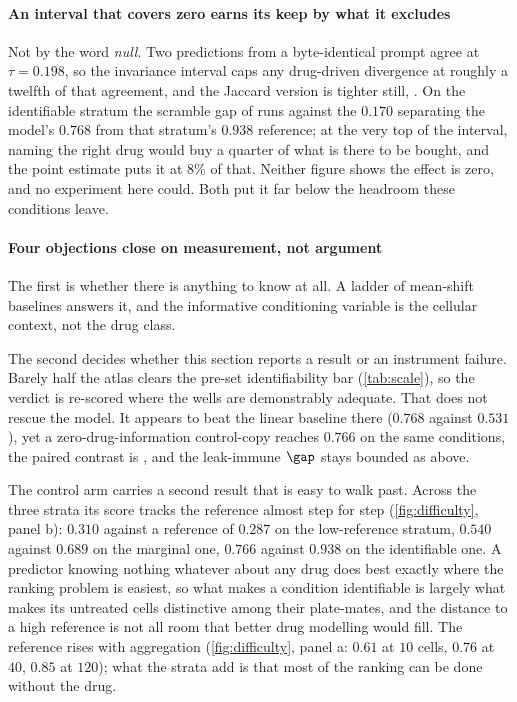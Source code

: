 \paragraph{An interval that covers zero earns its keep by what it excludes} Not
by the word \emph{null}. Two predictions from a byte-identical prompt agree at
$\tau = 0.198$, so the invariance interval caps any drug-driven divergence at
roughly a twelfth of that agreement, and the Jaccard version is tighter still,
. On the identifiable stratum the scramble gap of
 runs against the $0.170$ separating the model's
$0.768$ from that stratum's $0.938$ reference; at the very top of the interval,
naming the right drug would buy a quarter of what is there to be bought, and the
point estimate puts it at $8\%$ of that. Neither figure shows the effect is
zero, and no experiment here could. Both put it far below the headroom these
conditions leave.

\paragraph{Four objections close on measurement, not argument} The first is
whether there is anything to know at all. A ladder of mean-shift baselines
answers it, and the informative conditioning variable is the cellular context,
not the drug class.

The second decides whether this section reports a result or an instrument
failure. Barely half the atlas clears the pre-set identifiability bar
(\cref{tab:scale}), so the verdict is re-scored where the wells are demonstrably
adequate. That does not rescue the model. It appears to beat the linear baseline
there ($0.768$ against $0.531$), yet a zero-drug-information control-copy
reaches $0.766$ on the same conditions, the paired contrast is
, and the leak-immune $\gap$ stays bounded as above.

The control arm carries a second result that is easy to walk past. Across the
three strata its score tracks the reference almost step for step
(\cref{fig:difficulty}, panel b): $0.310$
against a reference of $0.287$ on the low-reference stratum, $0.540$ against
$0.689$ on the marginal one, $0.766$ against $0.938$ on the identifiable one. A
predictor knowing nothing whatever about any drug does best exactly where the
ranking problem is easiest, so what makes a condition identifiable is largely
what makes its untreated cells distinctive among their plate-mates, and the
distance to a high reference is not all room that better drug modelling would
fill. The reference rises with aggregation (\cref{fig:difficulty}, panel a:
$0.61$ at $10$ cells, $0.76$
at $40$, $0.85$ at $120$); what the strata add is that most of the ranking can
be done without the drug.

